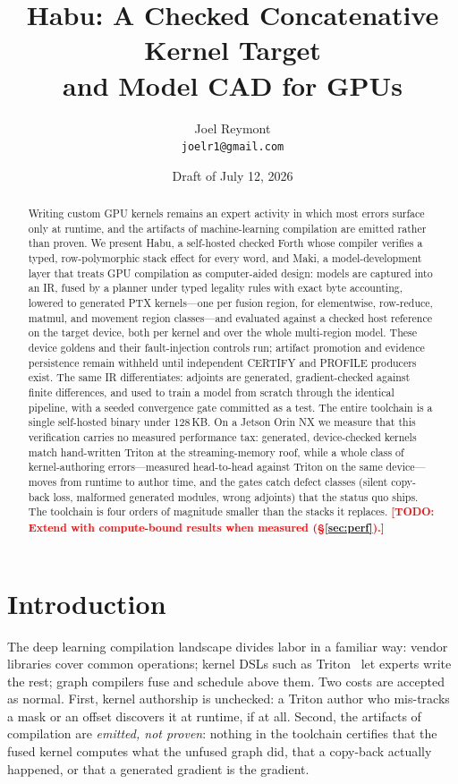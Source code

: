 \documentclass[11pt]{article}
\title{Habu: A Checked Concatenative Kernel Target\\and Model CAD for GPUs}
\author{Joel Reymont\\\texttt{joelr1@gmail.com}}
\date{Draft of July 12, 2026}
\newcommand{\todo}[1]{\textcolor{red}{\textbf{[TODO: #1]}}}
\begin{document}
\maketitle

\begin{abstract}
Writing custom GPU kernels remains an expert activity in which most errors
surface only at runtime, and the artifacts of machine-learning compilation
are emitted rather than proven. We present Habu, a self-hosted checked
Forth whose compiler verifies a typed, row-polymorphic stack effect for
every word, and Maki, a model-development layer that treats GPU compilation
as computer-aided design: models are captured into an IR, fused by a
planner under typed legality rules with exact byte accounting, lowered to
generated PTX kernels---one per fusion region, for elementwise, row-reduce,
matmul, and movement region classes---and evaluated against a checked host
reference on the target device, both per kernel and over the whole
multi-region model. These device goldens and their fault-injection controls
run; artifact promotion and evidence persistence remain withheld until
independent CERTIFY and PROFILE producers exist. The same IR differentiates:
adjoints are generated, gradient-checked against finite differences, and
used to train a model from scratch through the identical pipeline, with a
seeded convergence gate committed as a test. The entire toolchain is a
single self-hosted binary under 128\,KB. On a Jetson Orin NX we measure
that this verification carries no measured performance tax: generated,
device-checked kernels match hand-written Triton at the streaming-memory
roof, while a whole class of kernel-authoring errors---measured
head-to-head against Triton on the same device---moves from runtime to
author time, and the gates catch defect classes (silent copy-back loss,
malformed generated modules, wrong adjoints) that the status quo ships.
The toolchain is four orders of magnitude smaller than the stacks it
replaces. \todo{Extend with compute-bound results when measured
(\S\ref{sec:perf}).}
\end{abstract}

\section{Introduction}
The deep learning compilation landscape divides labor in a familiar way:
vendor libraries cover common operations; kernel DSLs such as
Triton~\cite{triton} let experts write the rest; graph compilers fuse and
schedule above them. Two costs are accepted as normal. First, kernel
authorship is unchecked: a Triton author who mis-tracks a mask or an
offset discovers it at runtime, if at all. Second, the artifacts of
compilation are \emph{emitted, not proven}: nothing in the toolchain
certifies that the fused kernel computes what the unfused graph did, that
a copy-back actually happened, or that a generated gradient is the
gradient.
\end{document}
